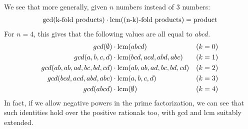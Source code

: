 We see that more generally, given $n$ numbers instead of 3 numbers:
\begin{align*}
  \gcd(\text{k-fold products})\cdot \operatorname*{lcm}(\text{(n-k)-fold products}) = \text{product}
\end{align*}
For $n=4$, this gives that the following values are all equal to $abcd$.
\begin{align*}
  gcd(\emptyset)&\cdot\operatorname*{lcm}(abcd) &(k=0)\\
  gcd(a,b,c,d)&\cdot\operatorname*{lcm}(bcd,acd,abd,abc) &(k=1)\\
  gcd(ab,ab,ad,bc,bd,cd)&\cdot\operatorname*{lcm}(ab,ab,ad,bc,bd,cd) &(k=2)\\
  gcd(bcd,acd,abd,abc)&\cdot\operatorname*{lcm}(a,b,c,d) &(k=3)\\
  gcd(abcd)&\cdot\operatorname*{lcm}(\emptyset) &(k=4)
\end{align*}
In fact, if we allow negative powers in the prime factorization,
we can see that such identities hold over the positive rationals too,
with gcd and lcm suitably extended.

